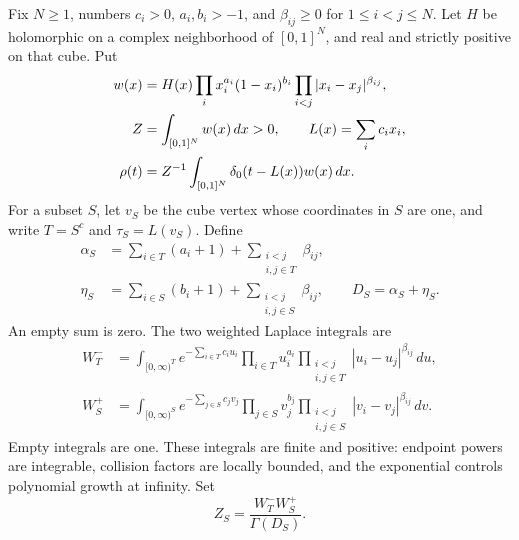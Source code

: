 \documentclass[11pt,a4paper]{article}
\theoremstyle{definition}
\theoremstyle{remark}
\numberwithin{equation}{section}
\begin{document}
Fix $N\geq1$, numbers $c_i>0$, $a_i,b_i>-1$, and
$\beta_{ij}\geq0$ for $1\leq i<j\leq N$. Let $H$ be holomorphic
on a complex neighborhood of $[0,1]^N$, and real and strictly positive
on that cube. Put
\begin{align}
 w(x)&=H(x)\prod_i x_i^{a_i}(1-x_i)^{b_i}
                    \prod_{i<j}|x_i-x_j|^{\beta_{ij}},\notag\\
 Z&=\int_{[0,1]^N}w(x)\,dx>0,
 \qquad L(x)=\sum_i c_ix_i,\label{p9:acg:graphical-weight}\\
 \rho(t)&=Z^{-1}\int_{[0,1]^N}\delta_0(t-L(x))w(x)\,dx.\notag
\end{align}
For a subset $S$, let $v_S$ be the cube vertex whose coordinates in
$S$ are one, and write $T=S^c$ and $\tau_S=L(v_S)$. Define
\begin{align*}
 \alpha_S&=\sum_{i\in T}(a_i+1)
              +\sum_{\substack{i<j\\i,j\in T}}\beta_{ij},\\
 \eta_S&=\sum_{i\in S}(b_i+1)
              +\sum_{\substack{i<j\\i,j\in S}}\beta_{ij},
 \qquad D_S=\alpha_S+\eta_S.
\end{align*}
An empty sum is zero. The two weighted Laplace integrals are
\begin{align*}
 W_T^-&=\int_{[0,\infty)^T}e^{-\sum_{i\in T}c_iu_i}
          \prod_{i\in T}u_i^{a_i}
          \prod_{\substack{i<j\\i,j\in T}}
                            |u_i-u_j|^{\beta_{ij}}\,du,\\
 W_S^+&=\int_{[0,\infty)^S}e^{-\sum_{j\in S}c_jv_j}
          \prod_{j\in S}v_j^{b_j}
          \prod_{\substack{i<j\\i,j\in S}}
                            |v_i-v_j|^{\beta_{ij}}\,dv.
\end{align*}
Empty integrals are one. These integrals are finite and positive:
endpoint powers are integrable, collision factors are locally bounded,
and the exponential controls polynomial growth at infinity.
Set
\[
 Z_S=\frac{W_T^-W_S^+}{\Gamma(D_S)}.
\]
\end{document}
